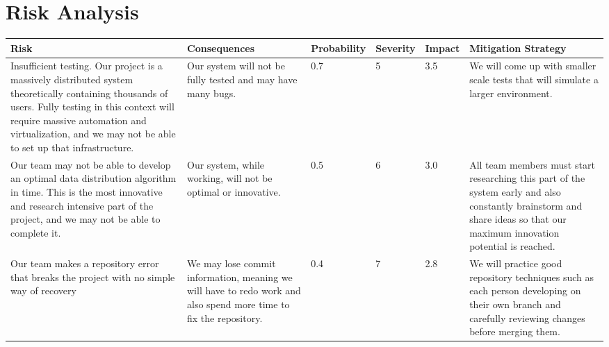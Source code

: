 \chapter{Risk Analysis}

\hspace*{-2cm}
\begin{tabular}{p{5cm} | p{3cm} | l | l | l | p{4cm}}

\hline

Risk & Consequences & Probability & Severity & Impact & Mitigation Strategy \\

\hline

Insufficient testing.  Our project is a massively distributed system theoretically containing thousands of users.  Fully testing in this context will require massive automation and virtualization, and we may not be able to set up that infrastructure. & Our system will not be fully tested and may have many bugs. & 0.7 & 5 & 3.5 & We will come up with smaller scale tests that will simulate a larger environment. \\

\hline

Our team may not be able to develop an optimal data distribution algorithm in time.  This is the most innovative and research intensive part of the project, and we may not be able to complete it. & Our system, while working, will not be optimal or innovative. & 0.5 & 6 & 3.0 & All team members must start researching this part of the system early and also constantly brainstorm and share ideas so that our maximum innovation potential is reached. \\

\hline

Our team makes a repository error that breaks the project with no simple way of recovery & We may lose commit information, meaning we will have to redo work and also spend more time to fix the repository. & 0.4 & 7 & 2.8 & We will practice good repository techniques such as each person developing on their own branch and carefully reviewing changes before merging them. \\

\hline

\end{tabular}
\hspace*{-2cm}